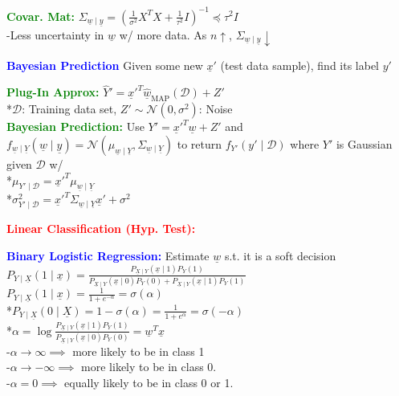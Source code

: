 \documentclass[5pt]{extarticle} %
\begin{document}
\begin{paracol}{3}
{    \textcolor{green}{\textbf{Covar. Mat:}} $\Sigma_{\underline{w} \mid \underline{y}} = \left( \frac{1}{\sigma^2} X^T X + \frac{1}{\tau^2} I \right)^{-1} \preceq \tau^2 I$ \\ 
    -Less uncertainty in $\underline{w}$ w/ more data. As $n \uparrow$, $\Sigma_{\underline{w} \mid \underline{y}} \downarrow$ 

    \textcolor{blue}{\textbf{Bayesian Prediction}} Given some new $\underline{x}'$ (test data sample), find its label $y'$ 

    \textcolor{green}{\textbf{Plug-In Approx:}} $\hat{Y}' = \underline{x}'^T \hat{\underline{w}}_{\text{MAP}}(\mathcal{D}) + Z'$ \\
    *$\mathcal{D}$: Training data set, $Z' \sim \mathcal{N}(0, \sigma^2)$: Noise \\

    \textcolor{green}{\textbf{Bayesian Prediction:}} Use $Y' = \underline{x}'^T \underline{w} + Z'$ and \\
    $f_{\underline{w} \mid \underline{Y}} (\underline{w} \mid \underline{y}) = \mathcal{N}(\mu_{\underline{w} \mid \underline{Y}}, \Sigma_{\underline{w} \mid \underline{Y}})$ to return $f_{Y'} (y' \mid \mathcal{D})$ where
    $Y'$ is Gaussian given $\mathcal{D}$ w/ \\
    *$\mu_{Y' \mid \mathcal{D}} = \underline{x}'^T \mu_{\underline{w} \mid \underline{Y}}$ \\
    *$\sigma^2_{Y' \mid \mathcal{D}} = \underline{x}'^T \Sigma_{\underline{w} \mid \underline{Y}} \underline{x}' + \sigma^2$

    \textcolor{red}{\textbf{Linear Classification (Hyp. Test):}} 

    \textcolor{blue}{\textbf{Binary Logistic Regression:}} Estimate $\underline{w}$ s.t. it is a soft decision \\
    $P_{Y \mid \underline{X}}(1 \mid \underline{x}) = \frac{P_{\underline{X} \mid Y}(\underline{x} \mid 1) P_Y(1)}{P_{\underline{X} \mid Y} (\underline{x} \mid 0) P_Y(0) + P_{\underline{X} \mid Y} (\underline{x} \mid 1) P_Y(1)}$ \\
    $P_{Y \mid \underline{X}}(1 \mid \underline{x}) = \frac{1}{1 + e^{-\alpha}} = \sigma(\alpha)$ \\
    *$P_{Y \mid \underline{X}}(0 \mid \underline{X}) = 1 - \sigma(\alpha) = \frac{1}{1 + e^{\alpha}} = \sigma(-\alpha)$ \\
    *$\alpha = \log \frac{P_{\underline{X} \mid Y} (\underline{x} \mid 1) P_Y(1)}{P_{\underline{X} \mid Y} (\underline{x} \mid 0) P_Y(0)} = \underline{w}^T \underline{x}$ \\
    -$\alpha \rightarrow \infty \implies$ more likely to be in class 1 \\
    -$\alpha \rightarrow -\infty \implies$ more likely to be in class 0. \\
    -$\alpha = 0 \implies$ equally likely to be in class 0 or 1.

}
\end{paracol}
\end{document}
